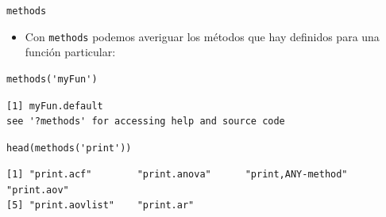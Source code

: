 \documentclass[xcolor={usenames,svgnames,dvipsnames}]{beamer}
\begin{document}
\begin{frame}[fragile,label={sec:orgheadline17}]{\texttt{methods}}
 \begin{itemize}
\item Con \texttt{methods} podemos averiguar los métodos que hay definidos para una función particular:
\end{itemize}
\lstset{language=R,label= ,caption= ,captionpos=b,numbers=none}
\begin{lstlisting}
methods('myFun')
\end{lstlisting}

\begin{verbatim}
[1] myFun.default
see '?methods' for accessing help and source code
\end{verbatim}

\lstset{language=R,label= ,caption= ,captionpos=b,numbers=none}
\begin{lstlisting}
head(methods('print'))
\end{lstlisting}

\begin{verbatim}
[1] "print.acf"        "print.anova"      "print,ANY-method" "print.aov"       
[5] "print.aovlist"    "print.ar"
\end{verbatim}
\end{frame}
\end{document}
